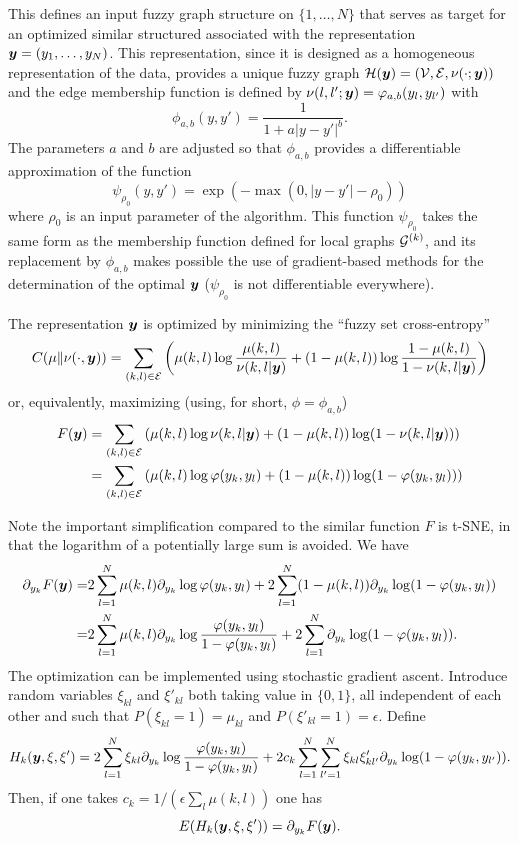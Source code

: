 This defines an input fuzzy graph structure on $\{1, \ldots, N\}$ that serves as target for an optimized similar structured associated with the representation ${\bm{y}} = (y_1, \ldots, y_N)$. This representation, since it is designed as a  homogeneous representation of the data, provides a unique fuzzy graph ${\mathcal H}({\bm{y}}) = ({\mathcal V}, {\mathcal E}, \nu(\cdot; {\bm{y}}))$ and the edge membership function is defined by $\nu(l,l';{\bm{y}}) = \varphi_{a,b}(y_l, y_{l'})$ with
\[
\phi_{a,b}(y,y') = \frac{1}{1 + a |y-y'|^b}.
\]
The parameters $a$ and $b$ are adjusted so that $\phi_{a,b}$ provides a differentiable approximation of the function
\[
\psi_{\rho_0}(y,y') = \exp(- \max(0, |y-y'| - \rho_0))
\]
where $\rho_0$ is an input parameter of the algorithm. This function $\psi_{\rho_0}$ takes the same form as the membership function defined for local graphs ${\mathcal G}^{(k)}$, and  its replacement by $\phi_{a,b}$ makes possible the use of gradient-based methods for the determination of the optimal ${\bm{y}}$ ($\psi_{\rho_0}$ is not differentiable everywhere).

The representation ${\bm{y}}$ is optimized by minimizing the ``fuzzy set cross-entropy''
\[
C(\mu\|\nu(\cdot, {\bm{y}})) = \sum_{(k,l) \in {\mathcal E}} \left(\mu(k,l) \log\frac{\mu(k,l)}{\nu(k,l|{\bm{y}})} +(1- \mu(k,l)) \log\frac{1-\mu(k,l)}{1-\nu(k,l|{\bm{y}})}\right)
\]
or, equivalently, maximizing (using, for short, $\phi = \phi_{a,b}$)
\begin{align*}
F({\bm{y}}) &= \sum_{(k,l) \in {\mathcal E}} \left(\mu(k,l) \log\nu(k,l|{\bm{y}}) +(1- \mu(k,l)) \log(1-\nu(k,l|{\bm{y}}))\right)\\
&= \sum_{(k,l) \in {\mathcal E}} \left(\mu(k,l) \log\varphi(y_k, y_{l}) +(1- \mu(k,l)) \log(1-\varphi(y_k,y_{l}))\right)\\
\end{align*}

Note the important simplification compared to the similar function $F$ is t-SNE, in that the logarithm of a potentially large sum is avoided. We have
\begin{align*}
\partial_{y_k} F({\bm{y}}) =& 2 \sum_{l=1}^N \mu(k,l) \partial_{y_k} \log\varphi(y_k, y_{l}) + 2 \sum_{l=1}^N (1-\mu(k,l)) \partial_{y_k} \log(1-\varphi(y_k, y_{l}))\\
=& 2 \sum_{l=1}^N \mu(k,l) \partial_{y_k} \log\frac{\varphi(y_k, y_{l})}{1-\varphi(y_k, y_{l})} + 2 \sum_{l=1}^N \partial_{y_k} \log(1-\varphi(y_k, y_{l})).
\end{align*}
The optimization can be implemented using stochastic gradient ascent. Introduce random variables $\xi_{kl}$ and $\xi'_{kl}$ both taking value in $\{0,1\}$, all independent of each other and such that $P(\xi_{kl} = 1) = \mu_{kl}$ and $P(\xi'_{kl} = 1) = \epsilon$. Define
\[
H_k({\bm{y}}, \xi, \xi') = 2 \sum_{l=1}^N \xi_{kl} \partial_{y_k} \log\frac{\varphi(y_k, y_{l})}{1-\varphi(y_k, y_{l})} + 2c_k  \sum_{l=1}^N\sum_{l'=1}^N \xi_{kl}\xi'_{kl'} \partial_{y_k} \log(1-\varphi(y_k, y_{l'})).
\]
Then, if one takes $c_k = 1/(\epsilon\sum_{l} \mu(k,l))$ one has
\[
E(H_k({\bm{y}}, \xi, \xi')) = \partial_{y_k} F({\bm{y}}).
\]

